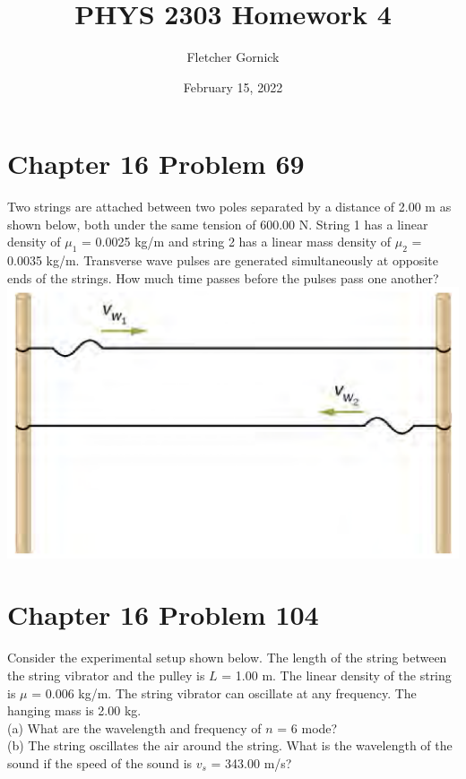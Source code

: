 \documentclass[11pt]{article}
\title{\vspace{-1.0cm}PHYS 2303 Homework 4}
\author{Fletcher Gornick}
\date{February 15, 2022}
\begin{document}
 \maketitle 
 \section*{Chapter 16 Problem 69}
 Two strings are attached between two poles separated by a distance of 2.00 m as shown below, both under the same tension of 600.00 N. 
 String 1 has a linear density of \(\mu_1\) = 0.0025 kg/m and string 2 has a linear mass density of \(\mu_2\) = 0.0035 kg/m. Transverse 
 wave pulses are generated simultaneously at opposite ends of the strings. How much time passes before the pulses pass one another? \\

 \includegraphics[scale=0.35]{16-69.png}
 \newpage

 \section*{Chapter 16 Problem 104}
  Consider the experimental setup shown below. The length of the string between the string vibrator and the pulley is \(L\) = 1.00 m. The 
  linear density of the string is \(\mu\) = 0.006 kg/m. The string vibrator can oscillate at any frequency. The hanging mass is 2.00 kg. \\

  (a) What are the wavelength and frequency of \(n\) = 6 mode? \\

  (b) The string oscillates the air around the string. What is the wavelength of the sound if the speed of the sound is \(v_s\) = 343.00 m/s?
\end{document}
